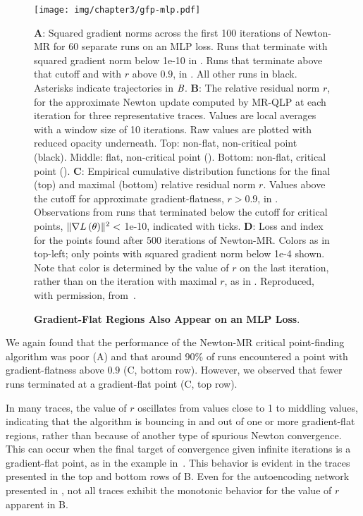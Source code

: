 \documentclass[../../thesis.tex]{subfiles}
\begin{document}
\begin{figure}[!hp]
	\begin{center}
		\texttt{[image: img/chapter3/gfp-mlp.pdf]}
	\end{center}
	\caption{\textbf{Gradient-Flat Regions Also Appear on an MLP Loss}.}{%
	\textbf{A}:
	Squared gradient norms across the first 100 iterations of Newton-MR
	for 60 separate runs on an MLP loss.
	Runs that terminate with squared gradient norm below 1e-10
	in \successcolor{}.
	Runs that terminate above that cutoff and with $r$ above $0.9$,
	in \failcolor{}.
	All other runs in black.
	Asterisks indicate trajectories in $\emph{B}$.
	\textbf{B}:
	The relative residual norm $r$,
	for the approximate Newton update
	computed by MR-QLP at each iteration
	for three representative traces.
	Values are local averages with a window size of 10 iterations.
	Raw values are plotted with reduced opacity underneath.
	Top: non-flat, non-critical point (black).
	Middle: flat, non-critical point (\failcolor{}).
	Bottom: non-flat, critical point (\successcolor{}).
	\textbf{C}:
	Empirical cumulative distribution functions for
	the final (top) and maximal (bottom) relative residual norm $r$.
	Values above the cutoff for approximate gradient-flatness, $r>0.9$,
	in \failcolor{}.
	Observations from runs that terminated below the cutoff for critical points,
	$\lVert\nabla L\left(\theta\right)\rVert^2 <$ 1e-10,
	indicated with \successcolor{} ticks.
	\textbf{D}:
	Loss and index for the points found
	after 500 iterations of Newton-MR\@.
	Colors as in top-left; only points with squared gradient norm below 1e-4 shown.
	Note that color is determined by
	the value of $r$ on the last iteration,
	rather than on the iteration with maximal $r$,
	as in .
	Reproduced, with permission,
	from~\cite{frye2020}.}
\end{figure}

We again found that the performance of
the Newton-MR critical point-finding algorithm was poor
(A)
and that around 90\% of runs encountered a point
with gradient-flatness above $0.9$
(C, bottom row).
However, we observed that fewer runs terminated
at a gradient-flat point
(C, top row).

In many traces,
the value of $r$ oscillates from values close to 1
to middling values,
indicating that the algorithm is bouncing in and out
of one or more gradient-flat regions,
rather than because of another type of spurious Newton convergence.
This can occur when the final target of convergence
given infinite iterations
is a gradient-flat point,
as in the example in~.
This behavior is evident in the traces presented in the top and bottom rows of
B.
Even for the autoencoding network presented in ,
not all traces exhibit the monotonic behavior for the value of $r$
apparent in B.
\end{document}
